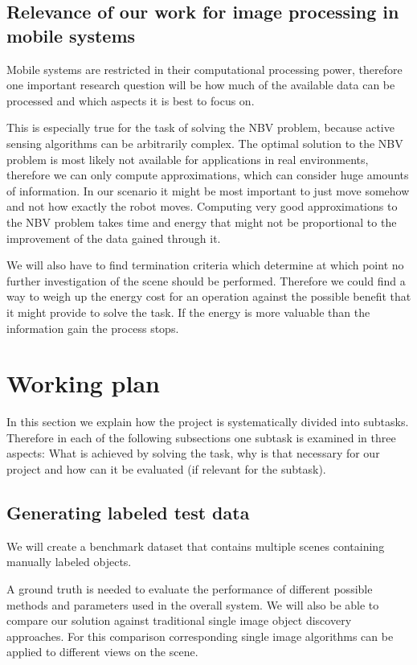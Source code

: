 \documentclass[a4paper,11pt,english]{article}
\begin{document}
\subsection{Relevance of our work for image processing in mobile systems}
Mobile systems are restricted in their computational processing power, therefore one important research question will be how much of the available data can be processed and which aspects it is best to focus on. 

This is especially true for the task of solving the NBV problem, because active sensing algorithms can be arbitrarily complex.
The optimal solution to the NBV problem is most likely not available for applications in real environments, therefore we can only compute approximations, which can consider huge amounts of information.
In our scenario it might be most important to just move somehow and not how exactly the robot moves.
Computing very good approximations to the NBV problem takes time and energy that might not be proportional to the improvement of the data gained through it.

We will also have to find termination criteria which determine at which point no further investigation of the scene should be performed.
Therefore we could find a way to weigh up the energy cost for an operation against the possible benefit that it might provide to solve the task.
If the energy is more valuable than the information gain the process stops.

\section{Working plan}
In this section we explain how the project is systematically divided into subtasks.
Therefore in each of the following subsections one subtask is examined in three aspects: What is achieved by solving the task, why is that necessary for our project and how can it be evaluated (if relevant for the subtask).

\subsection{Generating labeled test data}
We will create a benchmark dataset that contains multiple scenes containing manually labeled objects.

A ground truth is needed to evaluate the performance of different possible methods and parameters used in the overall system. We will also be able to compare our solution against traditional single image object discovery approaches. For this comparison corresponding single image algorithms can be applied to different views on the scene.
\end{document}

